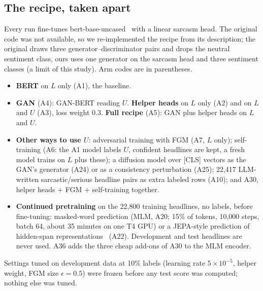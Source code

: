 \documentclass[conference]{IEEEtran}
\newcommand{\A}[1]{\textsf{#1}}                         %
\begin{document}
\subsection{The recipe, taken apart}
Every run fine-tunes bert-base-uncased~\cite{devlin2019bert} with a linear sarcasm head. The original code was not available, so we re-implemented the recipe from its description; the original draws three generator--discriminator pairs and drops the neutral sentiment class, ours uses one generator on the sarcasm head and three sentiment classes (a limit of this study). Arm codes are in parentheses.
\begin{itemize}
\item \textbf{BERT} on $L$ only (\A{A1}), the baseline.
\item \textbf{GAN} (\A{A4}): GAN-BERT reading $U$. \textbf{Helper heads} on $L$ only (\A{A2}) and on $L$ and $U$ (\A{A3}), loss weight 0.3. \textbf{Full recipe} (\A{A5}): GAN plus helper heads on $L$ and $U$.
\item \textbf{Other ways to use $U$}: adversarial training with FGM (\A{A7}, $L$ only); self-training (\A{A6}: the \A{A1} model labels $U$, confident headlines are kept, a fresh model trains on $L$ plus these); a diffusion model over [CLS] vectors as the GAN's generator (\A{A24}) or as a consistency perturbation (\A{A25}); 22,417 LLM-written sarcastic/serious headline pairs as extra labeled rows (\A{A10}); and \A{A30}, helper heads + FGM + self-training together.
\item \textbf{Continued pretraining} on the 22,800 training headlines, no labels, before fine-tuning: masked-word prediction (MLM, \A{A20}; 15\% of tokens, 10,000 steps, batch 64, about 35 minutes on one T4 GPU) or a JEPA-style prediction of hidden-span representations~\cite{assran2023ijepa} (\A{A22}). Development and test headlines are never used. \A{A36} adds the three cheap add-ons of \A{A30} to the MLM encoder.
\end{itemize}
Settings tuned on development data at 10\% labels (learning rate $5{\times}10^{-5}$, helper weight, FGM size $\epsilon{=}0.5$) were frozen before any test score was computed; nothing else was tuned.
\end{document}
